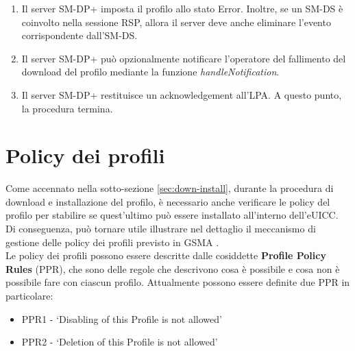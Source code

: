 \documentclass[10pt, oneside]{book}
\begin{document}
\begin{enumerate}
\item Il server SM-DP+ imposta il profilo allo stato Error. Inoltre, se un SM-DS è coinvolto nella sessione RSP, allora il server deve anche eliminare l'evento corrispondente dall'SM-DS.
\item Il server SM-DP+ può opzionalmente notificare l'operatore del fallimento del download del profilo mediante la funzione \textit{handleNotification}.
\item Il server SM-DP+ restituisce un acknowledgement all'LPA. A questo punto, la procedura termina.
\end{enumerate}

\section{Policy dei profili}\label{sec:profile-policy}
Come accennato nella sotto-sezione \ref{sec:down-install}, durante la procedura di download e installazione del profilo, è necessario anche verificare le policy del profilo per stabilire se quest'ultimo può essere installato all'interno dell'eUICC. Di conseguenza, può tornare utile illustrare nel dettaglio il meccanismo di gestione delle policy dei profili previsto in GSMA \cite{GSMA-docs-new}.\\
Le policy dei profili possono essere descritte dalle cosiddette \textbf{Profile Policy Rules} (PPR), che sono delle regole che descrivono cosa è possibile e cosa non è possibile fare con ciascun profilo. Attualmente possono essere definite due PPR in particolare:
\begin{itemize}
\item PPR1 - `Disabling of this Profile is not allowed'
\item PPR2 - `Deletion of this Profile is not allowed'
\end{itemize}
\end{document}

